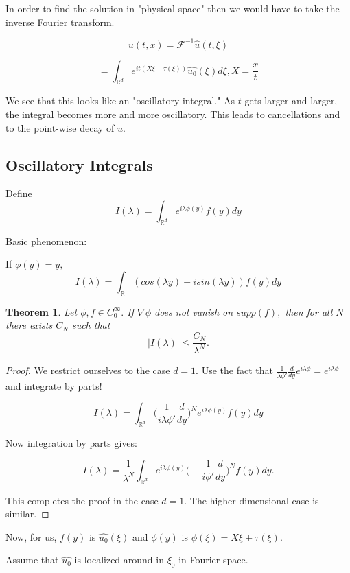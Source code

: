 \documentclass[11pt]{amsart}
\theoremstyle{plain}
\numberwithin{equation}{section}
\newtheorem{thm}{Theorem}[section]
\theoremstyle{remark}
\newcommand{\R}{\mathbb{R}}
\begin{document}
In order to find the solution in "physical space" then we would have to take the inverse Fourier transform. 

$$u(t,x) = \mathcal{F}^{-1} \hat{u}(t,\xi) $$ 

$$= \int_{\R^d} e^{it(X\xi+\tau(\xi))}\hat{u_{0}}(\xi)d\xi, X=\frac{x}{t}$$

We see that this looks like an "oscillatory integral." As $t$ gets larger and larger, the integral becomes more and more oscillatory. This leads to cancellations and to the point-wise decay of $u.$

\subsection{Oscillatory Integrals}

Define $$I(\lambda) = \int_{\R^d} e^{i\lambda\phi(y)}f(y)dy$$

Basic phenomenon:

If $\phi(y)=y,$  $$I(\lambda)= \int_{\R} (cos(\lambda y)+i sin(\lambda y))f(y)dy$$

\begin{thm}

Let $\phi, f \in C^{\infty}_{0}.$ If $\nabla \phi$ does not vanish on $supp(f),$ then for all $N$ there exists $C_{N}$ such that $$|I(\lambda)| \leq \frac{C_{N}}{\lambda^N}.$$


\end{thm}

\begin{proof}
We restrict ourselves to the case $d=1.$ Use the fact that $\frac{1}{\lambda \phi'} \frac{d}{dy} e^{i\lambda \phi} =e^{i\lambda \phi}$ and integrate by parts!

$$I(\lambda) = \int_{\R^d} \big ( \frac{1}{i\lambda \phi'} \frac{d}{dy} \big)^N e^{i\lambda \phi(y)}f(y)dy$$

Now integration by parts gives:

$$I(\lambda) = \frac{1}{\lambda^N}\int_{\R^d}  e^{i\lambda \phi(y)} \big ( -\frac{1}{i\phi'} \frac{d}{dy} \big)^N f(y)dy.$$

This completes the proof in the case $d=1.$ The higher dimensional case is similar. 

\end{proof}


Now, for us, $f(y)$ is $\hat{u_0} (\xi)$ and $\phi(y)$ is $\phi(\xi) = X\xi +\tau(\xi).$

Assume that $\hat{u_{0}}$ is localized around in $\xi_0$ in Fourier space. 
\end{document}
